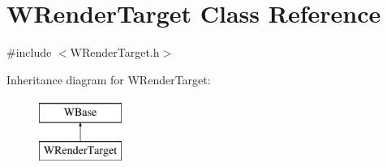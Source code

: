 \hypertarget{class_w_render_target}{}\section{W\+Render\+Target Class Reference}
\label{class_w_render_target}


{\ttfamily \#include $<$W\+Render\+Target.\+h$>$}

Inheritance diagram for W\+Render\+Target\+:\begin{figure}[H]
\begin{center}
\leavevmode
\includegraphics[height=2.000000cm]{class_w_render_target}
\end{center}
\end{figure}
